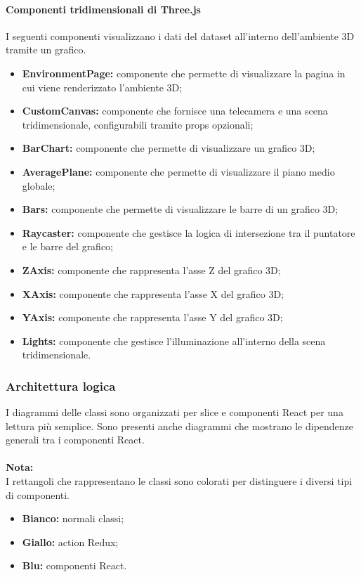 \paragraph{Componenti tridimensionali di Three.js}
I seguenti componenti visualizzano i dati del dataset all'interno dell'ambiente
3D tramite un grafico.
\begin{itemize}
    \item \textbf{EnvironmentPage:} componente che permette di visualizzare la pagina in cui viene renderizzato l'ambiente 3D;
    \item \textbf{CustomCanvas:} componente che fornisce una telecamera e una scena tridimensionale, configurabili tramite props opzionali;
    \item \textbf{BarChart:} componente che permette di visualizzare un grafico 3D;
    \item \textbf{AveragePlane:} componente che permette di visualizzare il piano medio globale;
    \item \textbf{Bars:} componente che permette di visualizzare le barre di un grafico 3D;
    \item \textbf{Raycaster:} componente che gestisce la logica di intersezione tra il puntatore e le barre del grafico;
    \item \textbf{ZAxis:} componente che rappresenta l'asse Z del grafico 3D;
    \item \textbf{XAxis:} componente che rappresenta l'asse X del grafico 3D;
    \item \textbf{YAxis:} componente che rappresenta l'asse Y del grafico 3D;
    \item \textbf{Lights:} componente che gestisce l'illuminazione all'interno della scena tridimensionale.
\end{itemize}

\pagebreak

\subsubsection{Architettura logica}
I diagrammi delle classi sono organizzati per slice e componenti React per una
lettura più semplice. Sono presenti anche diagrammi che mostrano le dipendenze
generali tra i componenti React.\\\\ \textbf{Nota:}\\ I rettangoli che
rappresentano le classi sono colorati per distinguere i diversi tipi di
componenti.
\begin{itemize}
    \item \textbf{Bianco:} normali classi;
    \item \textbf{Giallo:} action Redux;
    \item \textbf{Blu:} componenti React.
\end{itemize}

